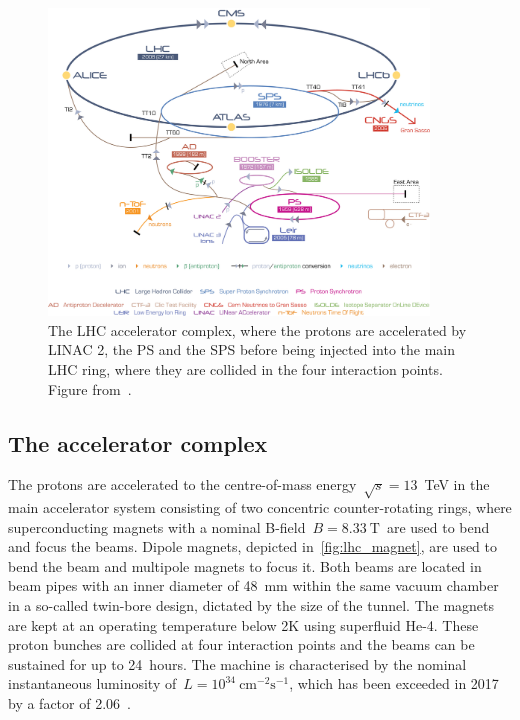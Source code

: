 \begin{figure}
\begin{centering}
\includegraphics[width=0.9\textwidth]{figures/exp/accelerators.jpg}
\caption[The LHC accelerator complex]{The LHC accelerator complex, where the protons are accelerated by LINAC 2, the PS and the SPS before being injected into the main LHC ring, where they are collided in the four interaction points. Figure from~\cite{Garoby:2007zz}.}
\label{fig:lhc_accelerators}
\end{centering}
\end{figure}

\subsection{The accelerator complex}
The protons are accelerated to the centre-of-mass energy~$\sqrt{s} = 13$~TeV in the main accelerator system consisting of two concentric counter-rotating rings, where superconducting magnets with a nominal B-field~$B=8.33~\mathrm{T}$~are used to bend and focus the beams. Dipole magnets, depicted in~\cref{fig:lhc_magnet}, are used to bend the beam and multipole magnets to focus it. Both beams are located in beam pipes with an inner diameter of 48~mm within the same vacuum chamber in a so-called twin-bore design, dictated by the size of the tunnel. The magnets are kept at an operating temperature below 2K using superfluid He-4. These proton bunches are collided at four interaction points and the beams can be sustained for up to 24~hours. The machine is characterised by the nominal instantaneous luminosity of~$L=10^{34}~\mathrm{cm}^{-2}\mathrm{s}^{-1}$, which has been exceeded in 2017 by a factor of 2.06~\cite{Pralavorio:2295027}.


